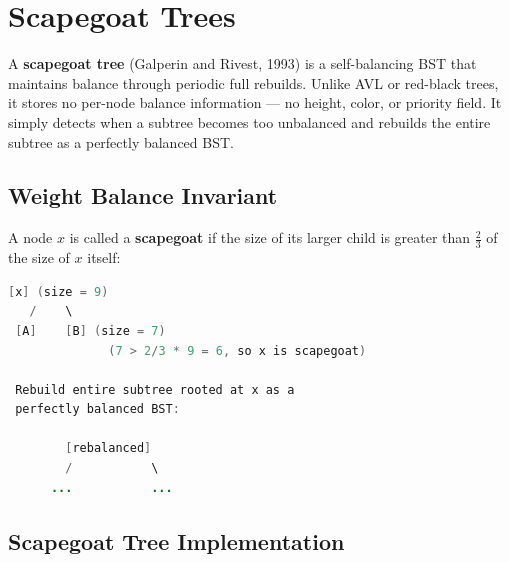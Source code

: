 \section{Scapegoat Trees}

A \textbf{scapegoat tree} (Galperin and Rivest, 1993) is a self-balancing BST that maintains balance through periodic full rebuilds. Unlike AVL or red-black trees, it stores no per-node balance information --- no height, color, or priority field. It simply detects when a subtree becomes too unbalanced and rebuilds the entire subtree as a perfectly balanced BST.

\subsection{Weight Balance Invariant}

A node $x$ is called a \textbf{scapegoat} if the size of its larger child is greater than $\frac{2}{3}$ of the size of $x$ itself:

\begin{lstlisting}[language=Java]
    [x] (size = 9)
   /    \
 [A]    [B] (size = 7)
              (7 > 2/3 * 9 = 6, so x is scapegoat)

 Rebuild entire subtree rooted at x as a
 perfectly balanced BST:

        [rebalanced]
        /           \
      ...           ...
\end{lstlisting}

\subsection{Scapegoat Tree Implementation}


